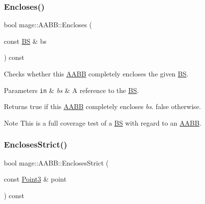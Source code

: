 \subsubsection{\texorpdfstring{Encloses()}{Encloses()}\hspace{0.1cm}{\footnotesize\ttfamily [4/4]}}
{\footnotesize\ttfamily bool mage\+::\+A\+A\+B\+B\+::\+Encloses (\begin{DoxyParamCaption}\item[{const \hyperlink{structmage_1_1_b_s}{BS} \&}]{bs }\end{DoxyParamCaption}) const\hspace{0.3cm}{\ttfamily [noexcept]}}

Checks whether this \hyperlink{structmage_1_1_a_a_b_b}{A\+A\+BB} completely encloses the given \hyperlink{structmage_1_1_b_s}{BS}.


\begin{DoxyParams}[1]{Parameters}
\mbox{\tt in}  & {\em bs} & A reference to the \hyperlink{structmage_1_1_b_s}{BS}. \\
\hline
\end{DoxyParams}
\begin{DoxyReturn}{Returns}
{\ttfamily true} if this \hyperlink{structmage_1_1_a_a_b_b}{A\+A\+BB} completely encloses {\itshape bs}. {\ttfamily false} otherwise. 
\end{DoxyReturn}
\begin{DoxyNote}{Note}
This is a full coverage test of a \hyperlink{structmage_1_1_b_s}{BS} with regard to an \hyperlink{structmage_1_1_a_a_b_b}{A\+A\+BB}. 
\end{DoxyNote}
\hypertarget{structmage_1_1_a_a_b_b_a0399860c66da2dfc593b6ad5702c7525}{}\label{structmage_1_1_a_a_b_b_a0399860c66da2dfc593b6ad5702c7525} 
\subsubsection{\texorpdfstring{Encloses\+Strict()}{EnclosesStrict()}\hspace{0.1cm}{\footnotesize\ttfamily [1/4]}}
{\footnotesize\ttfamily bool mage\+::\+A\+A\+B\+B\+::\+Encloses\+Strict (\begin{DoxyParamCaption}\item[{const \hyperlink{structmage_1_1_point3}{Point3} \&}]{point }\end{DoxyParamCaption}) const\hspace{0.3cm}{\ttfamily [noexcept]}}

